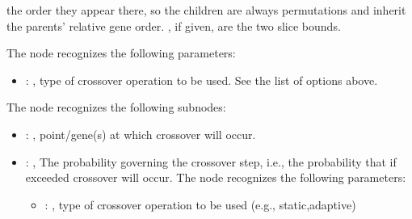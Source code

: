 \begin{itemize}
\begin{itemize}
\begin{itemize}
\begin{itemize}
              the order they appear there, so the children are always permutations and inherit the
              parents' relative gene order. , if given, are the two slice bounds.
              \end{itemize}
              The  node recognizes the following parameters:
                \begin{itemize}
                  \item {}: ,
                    type of crossover operation to be used. See the list of options above.
              \end{itemize}

              The  node recognizes the following subnodes:
              \begin{itemize}
                \item {}: ,
                  point/gene(s) at which crossover will occur.

                \item {}: ,
                  The probability governing the crossover step, i.e., the probability that if
                  exceeded crossover will occur.
                  The  node recognizes the following parameters:
                    \begin{itemize}
                      \item {}: ,
                        type of crossover operation to be used (e.g., static,adaptive)
                  \end{itemize}
              \end{itemize}


\end{itemize}
\end{itemize}
\end{itemize}
